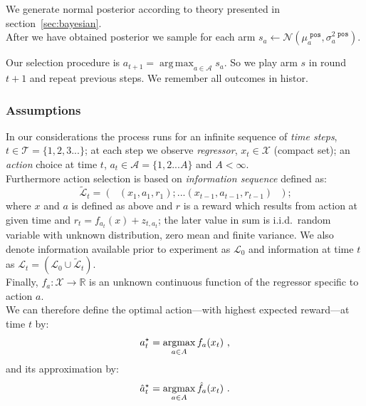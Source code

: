 \documentclass[12pt, a4paper, pdflatex, leqno]{report}
\newcommand{\argmax}{\operatornamewithlimits{argmax}}
\begin{document}
We generate normal posterior according to theory presented in section~\ref{sec:bayesian}.\\

After we have obtained posterior we sample for each arm $\mathit{s}_a \leftarrow \mathcal{N}(\mu_a^{\texttt{ pos}}, \sigma^{2\texttt{ pos}}_a)$.

Our selection procedure is $\mathit{a}_{t+1} = \operatorname{arg\,max}_{a \in \mathscr{A}} \mathit{s}_a$. So we play arm $s$ in round $t+1$ and repeat previous steps. We remember all outcomes in histor.\\


\subsubsection{Assumptions}
In our considerations the process runs for an infinite sequence of \emph{time steps}, $t \in \mathscr{T} = \{ 1,2,3... \}$; at each step we observe \emph{regressor}, $x_t \in \mathscr{X}$ (compact set); an \emph{action} choice at time $t$, $a_t \in \mathscr{A} = \{ 1,2...A \}$ and $A<\infty$.\\
Furthermore action selection is based on \emph{information sequence} defined as:
$$
  \tilde{\mathscr{L}}_t = \left( \text{  } (x_1,a_1,r_1);...(x_{t-1},a_{t-1},r_{t-1}) \text{  } \right) \text{;}
$$
where $x$ and $a$ is defined as above and $r$ is a reward which results from action at given time and $r_t = f_{a_t}(x) + z_{t,a_t}$; the later value in sum is i.i.d.\ random variable with unknown distribution, zero mean and finite variance. We also denote information available prior to experiment as $\mathscr{L}_0$ and information at time $t$ as $\mathscr{L}_t = \left( \mathscr{L}_0 \cup \tilde{\mathscr{L}}_t \right)$.\\
Finally, $f_a : \mathscr{X} \rightarrow \mathbb{R}$ is an unknown continuous function of the regressor specific to action $a$.\\



We can therefore define the optimal action---with highest expected reward---at time $t$ by:
\begin{equation}
  a_t^\star = \argmax_{a \in A} f_a (x_t) \text{ ,}
\end{equation}
and its approximation by:
\begin{equation}
  \label{eqn:optsol} \hat{a}_t^\star = \argmax_{a \in A} \hat{f}_a (x_t) \text{ .}
\end{equation}
\end{document}
